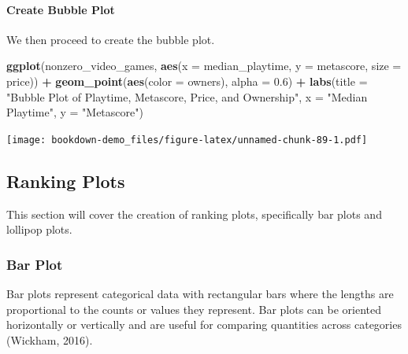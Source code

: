 \documentclass[
  b5paper]{book}
\newenvironment{Shaded}{\begin{snugshade}}{\end{snugshade}}
\newcommand{\AttributeTok}[1]{\textcolor[rgb]{0.13,0.29,0.53}{#1}}
\newcommand{\FloatTok}[1]{\textcolor[rgb]{0.00,0.00,0.81}{#1}}
\newcommand{\FunctionTok}[1]{\textcolor[rgb]{0.13,0.29,0.53}{\textbf{#1}}}
\newcommand{\NormalTok}[1]{#1}
\newcommand{\SpecialCharTok}[1]{\textcolor[rgb]{0.81,0.36,0.00}{\textbf{#1}}}
\newcommand{\StringTok}[1]{\textcolor[rgb]{0.31,0.60,0.02}{#1}}
\begin{document}
\hypertarget{create-bubble-plot}{%
\paragraph*{Create Bubble Plot}\label{create-bubble-plot}}

We then proceed to create the bubble plot.

\begin{Shaded}
\begin{Highlighting}[]
\FunctionTok{ggplot}\NormalTok{(nonzero\_video\_games, }\FunctionTok{aes}\NormalTok{(}\AttributeTok{x =}\NormalTok{ median\_playtime, }\AttributeTok{y =}\NormalTok{ metascore, }\AttributeTok{size =}\NormalTok{ price)) }\SpecialCharTok{+}
  \FunctionTok{geom\_point}\NormalTok{(}\FunctionTok{aes}\NormalTok{(}\AttributeTok{color =}\NormalTok{ owners), }\AttributeTok{alpha =} \FloatTok{0.6}\NormalTok{) }\SpecialCharTok{+}
  \FunctionTok{labs}\NormalTok{(}\AttributeTok{title =} \StringTok{"Bubble Plot of Playtime, Metascore, Price, and Ownership"}\NormalTok{,}
       \AttributeTok{x =} \StringTok{"Median Playtime"}\NormalTok{,}
       \AttributeTok{y =} \StringTok{"Metascore"}\NormalTok{)}
\end{Highlighting}
\end{Shaded}

\texttt{[image: bookdown-demo\_files/figure-latex/unnamed-chunk-89-1.pdf]}

\hypertarget{ranking-plots}{%
\subsection*{Ranking Plots}\label{ranking-plots}}

This section will cover the creation of ranking plots, specifically bar plots and lollipop plots.

\hypertarget{bar-plot}{%
\subsubsection*{Bar Plot}\label{bar-plot}}

Bar plots represent categorical data with rectangular bars where the lengths are proportional to the counts or values they represent. Bar plots can be oriented horizontally or vertically and are useful for comparing quantities across categories (Wickham, 2016).
\end{document}
